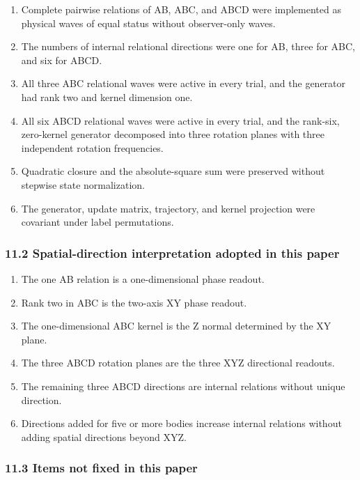 \documentclass[
  10pt,
  a4paper,
]{article}
\providecommand{\tightlist}{%
  \setlength{\itemsep}{0pt}\setlength{\parskip}{0pt}}
\begin{document}
\begin{enumerate}
\def\labelenumi{\arabic{enumi}.}
\tightlist
\item
  Complete pairwise relations of AB, ABC, and ABCD were implemented as
  physical waves of equal status without observer-only waves.
\item
  The numbers of internal relational directions were one for AB, three
  for ABC, and six for ABCD.
\item
  All three ABC relational waves were active in every trial, and the
  generator had rank two and kernel dimension one.
\item
  All six ABCD relational waves were active in every trial, and the
  rank-six, zero-kernel generator decomposed into three rotation planes
  with three independent rotation frequencies.
\item
  Quadratic closure and the absolute-square sum were preserved without
  stepwise state normalization.
\item
  The generator, update matrix, trajectory, and kernel projection were
  covariant under label permutations.
\end{enumerate}

\subsubsection{11.2 Spatial-direction interpretation adopted in this
paper}\label{spatial-direction-interpretation-adopted-in-this-paper}

\begin{enumerate}
\def\labelenumi{\arabic{enumi}.}
\tightlist
\item
  The one AB relation is a one-dimensional phase readout.
\item
  Rank two in ABC is the two-axis XY phase readout.
\item
  The one-dimensional ABC kernel is the Z normal determined by the XY
  plane.
\item
  The three ABCD rotation planes are the three XYZ directional readouts.
\item
  The remaining three ABCD directions are internal relations without
  unique direction.
\item
  Directions added for five or more bodies increase internal relations
  without adding spatial directions beyond XYZ.
\end{enumerate}

\subsubsection{11.3 Items not fixed in this
paper}\label{items-not-fixed-in-this-paper}
\end{document}
